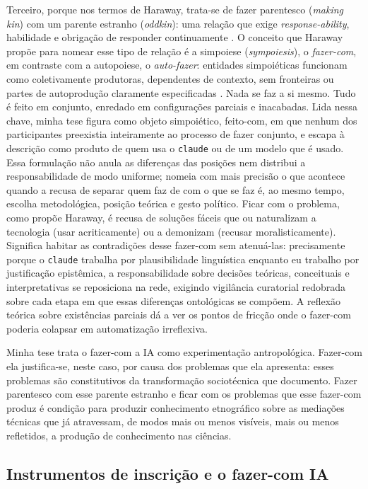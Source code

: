 Terceiro, porque nos termos de Haraway, trata-se de fazer parentesco (\textit{making kin}) com um parente estranho (\textit{oddkin}): uma relação que exige \textit{response-ability}, habilidade e obrigação de responder continuamente \parencite{Haraway2016Staying}. O conceito que Haraway propõe para nomear esse tipo de relação é a simpoiese (\textit{sympoiesis}), o \textit{fazer-com}, em contraste com a autopoiese, o \textit{auto-fazer}: entidades simpoiéticas funcionam como coletivamente produtoras, dependentes de contexto, sem fronteiras ou partes de autoprodução claramente especificadas \parencite{Haraway2016Staying}. Nada se faz a si mesmo. Tudo é feito em conjunto, enredado em configurações parciais e inacabadas. Lida nessa chave, minha tese figura como objeto simpoiético, feito-com, em que nenhum dos participantes preexistia inteiramente ao processo de fazer conjunto, e escapa à descrição como produto de quem usa o \texttt{claude} ou de um modelo que é usado. Essa formulação não anula as diferenças das posições nem distribui a responsabilidade de modo uniforme; nomeia com mais precisão o que acontece quando a recusa de separar quem faz de com o que se faz é, ao mesmo tempo, escolha metodológica, posição teórica e gesto político. Ficar com o problema, como propõe Haraway, é recusa de soluções fáceis que ou naturalizam a tecnologia (usar acriticamente) ou a demonizam (recusar moralisticamente). Significa habitar as contradições desse fazer-com sem atenuá-las: precisamente porque o \texttt{claude} trabalha por plausibilidade linguística enquanto eu trabalho por justificação epistêmica, a responsabilidade sobre decisões teóricas, conceituais e interpretativas se reposiciona na rede, exigindo vigilância curatorial redobrada sobre cada etapa em que essas diferenças ontológicas se compõem. A reflexão teórica sobre existências parciais dá a ver os pontos de fricção onde o fazer-com poderia colapsar em automatização irreflexiva.

Minha tese trata o fazer-com a IA como experimentação antropológica. Fazer-com ela justifica-se, neste caso, por causa dos problemas que ela apresenta: esses problemas são constitutivos da transformação sociotécnica que documento. Fazer parentesco com esse parente estranho e ficar com os problemas que esse fazer-com produz é condição para produzir conhecimento etnográfico sobre as mediações técnicas que já atravessam, de modos mais ou menos visíveis, mais ou menos refletidos, a produção de conhecimento nas ciências.

\subsection{Instrumentos de inscrição e o fazer-com IA}

